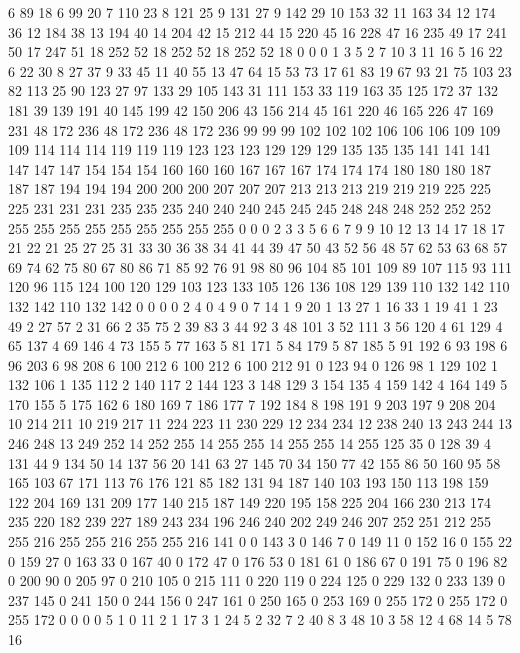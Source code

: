 6 89 18 6 99 20 7 110 23 8 121 25 9 131 27 9 142 29 10 153 32 11 163 34 12 174 36 12 184 38 13 194 40 14 204 42 15 212 44 15 220 45 16 228 47 16 235 49 17 241 50 17 247 51 18 252 52 18 252 52 18 252 52 18 0 0 0 1 3 5 2 7 10 3 11 16 5 16 22 6 22 30 8 27 37 9 33 45 11 40 55 13 47 64 15 53 73 17 61 83 19 67 93 21 75 103 23 82 113 25 90 123 27 97 133 29 105 143 31 111 153 33 119 163 35 125 172 37 132 181 39 139 191 40 145 199 42 150 206 43 156 214 45 161 220 46 165 226 47 169 231 48 172 236 48 172 236 48 172 236 99 99 99 102 102 102 106 106 106 109 109 109 114 114 114 119 119 119 123 123 123 129 129 129 135 135 135 141 141 141 147 147 147 154 154 154 160 160 160 167 167 167 174 174 174 180 180 180 187 187 187 194 194 194 200 200 200 207 207 207 213 213 213 219 219 219 225 225 225 231 231 231 235 235 235 240 240 240 245 245 245 248 248 248 252 252 252 255 255 255 255 255 255 255 255 255 
0 0 0 2 3 3 5 6 6 7 9 9 10 12 13 14 17 18 17 21 22 21 25 27 25 31 33 30 36 38 34 41 44 39 47 50 43 52 56 48 57 62 53 63 68 57 69 74 62 75 80 67 80 86 71 85 92 76 91 98 80 96 104 85 101 109 89 107 115 93 111 120 96 115 124 100 120 129 103 123 133 105 126 136 108 129 139 110 132 142 110 132 142 110 132 142 0 0 0 0 2 4 0 4 9 0 7 14 1 9 20 1 13 27 1 16 33 1 19 41 1 23 49 2 27 57 2 31 66 2 35 75 2 39 83 3 44 92 3 48 101 3 52 111 3 56 120 4 61 129 4 65 137 4 69 146 4 73 155 5 77 163 5 81 171 5 84 179 5 87 185 5 91 192 6 93 198 6 96 203 6 98 208 6 100 212 6 100 212 6 100 212 91 0 123 94 0 126 98 1 129 102 1 132 106 1 135 112 2 140 117 2 144 123 3 148 129 3 154 135 4 159 142 4 164 149 5 170 155 5 175 162 6 180 169 7 186 177 7 192 184 8 198 191 9 203 197 9 208 204 10 214 211 10 219 217 
11 224 223 11 230 229 12 234 234 12 238 240 13 243 244 13 246 248 13 249 252 14 252 255 14 255 255 14 255 255 14 255 125 35 0 128 39 4 131 44 9 134 50 14 137 56 20 141 63 27 145 70 34 150 77 42 155 86 50 160 95 58 165 103 67 171 113 76 176 121 85 182 131 94 187 140 103 193 150 113 198 159 122 204 169 131 209 177 140 215 187 149 220 195 158 225 204 166 230 213 174 235 220 182 239 227 189 243 234 196 246 240 202 249 246 207 252 251 212 255 255 216 255 255 216 255 255 216 141 0 0 143 3 0 146 7 0 149 11 0 152 16 0 155 22 0 159 27 0 163 33 0 167 40 0 172 47 0 176 53 0 181 61 0 186 67 0 191 75 0 196 82 0 200 90 0 205 97 0 210 105 0 215 111 0 220 119 0 224 125 0 229 132 0 233 139 0 237 145 0 241 150 0 244 156 0 247 161 0 250 165 0 253 169 0 255 172 0 255 172 0 255 172 0 0 0 0 5 1 0 11 2 1 17 3 1 24 5 2 32 7 2 40 8 3 48 10 3 58 12 4 68 14 5 78 16 
